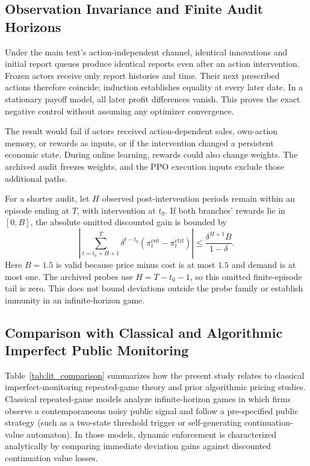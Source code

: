 \documentclass{article}
\begin{document}
\subsection{Observation Invariance and Finite Audit Horizons}

Under the main text's action-independent channel, identical innovations and initial report queues produce identical reports even after an action intervention. Frozen actors receive only report histories and time. Their next prescribed actions therefore coincide; induction establishes equality at every later date. In a stationary payoff model, all later profit differences vanish. This proves the exact negative control without assuming any optimizer convergence.

The result would fail if actors received action-dependent sales, own-action memory, or rewards as inputs, or if the intervention changed a persistent economic state. During online learning, rewards could also change weights. The archived audit freezes weights, and the PPO execution inputs exclude those additional paths.

For a shorter audit, let $H$ observed post-intervention periods remain within an episode ending at $T$, with intervention at $t_0$. If both branches' rewards lie in $[0, B]$, the absolute omitted discounted gain is bounded by
\[
\left| \sum_{t=t_0+H+1}^{T} \delta^{t-t_0} (\pi_t^{\mathrm{cut}} - \pi_t^{\mathrm{ctrl}}) \right| \leq \frac{\delta^{H+1} B}{1-\delta}.
\]
Here $B = 1.5$ is valid because price minus cost is at most $1.5$ and demand is at most one. The archived probes use $H = T - t_0 - 1$, so this omitted finite-episode tail is zero. This does not bound deviations outside the probe family or establish immunity in an infinite-horizon game.

\subsection{Comparison with Classical and Algorithmic Imperfect Public Monitoring}

Table~\ref{tab:lit_comparison} summarizes how the present study relates to classical imperfect-monitoring repeated-game theory and prior algorithmic pricing studies. Classical repeated-game models \citep{green1984noncooperative, abreu1990toward, fudenberg1994folk} analyze infinite-horizon games in which firms observe a contemporaneous noisy public signal and follow a pre-specified public strategy (such as a two-state threshold trigger or self-generating continuation-value automaton). In those models, dynamic enforcement is characterized analytically by comparing immediate deviation gains against discounted continuation value losses.
\end{document}

